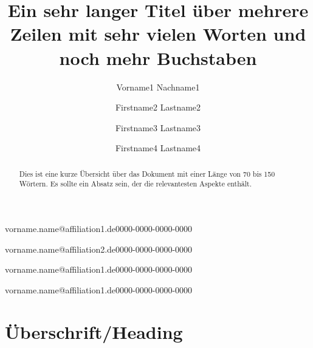 \documentclass[]{lni}
\begin{document}
\title[Ein Kurztitel]{Ein sehr langer Titel über mehrere Zeilen mit sehr vielen
Worten und noch mehr Buchstaben}
\author[1]{Vorname1 Nachname1}{vorname.name@affiliation1.de}{0000-0000-0000-0000}
\author[2]{Firstname2 Lastname2}{vorname.name@affiliation2.de}{0000-0000-0000-0000}
\author[1]{Firstname3 Lastname3}{vorname.name@affiliation1.de}{0000-0000-0000-0000}
\author[1]{Firstname4 Lastname4}{vorname.name@affiliation1.de}{0000-0000-0000-0000}%
\maketitle

\begin{abstract}
Dies ist eine kurze Übersicht über das Dokument mit einer Länge von
70 bis 150 Wörtern. Es sollte ein Absatz sein, der die relevantesten
Aspekte enthält.
\end{abstract}
\section{Überschrift/Heading}

\end{document}

